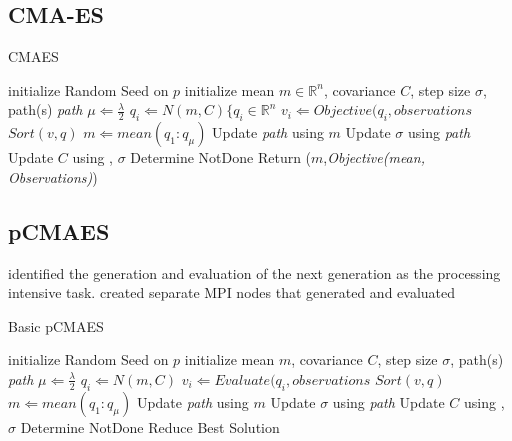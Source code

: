 \documentclass[twocolumn, balance]{article}
\begin{document}
\subsection{CMA-ES}
\begin{algorithm}[h!]
\caption{CMAES}
\label{CMAES}
\begin{algorithmic}
\STATE initialize Random Seed on $p$
\STATE initialize mean $m \in \mathbb{R}^n$, covariance $C$, step size $\sigma$, path(s) \textit{path}
\STATE $\mu \Leftarrow \frac{\lambda}{2}$
		\STATE $q_i \Leftarrow N(m,C) \{q_i \in \mathbb{R}^n$
		\STATE $v_i \Leftarrow \textit{Objective}(q_i, \textit{observations}$
	\ENDFOR
	\STATE $\textit{Sort}(v,q)$
	\STATE $m \Leftarrow \textit{mean}(q_1:q_\mu)$
	\STATE Update \textit{path} using $m$
	\STATE Update $\sigma$ using \textit{path}
	\STATE Update $C$ using , $\sigma$
	\STATE Determine NotDone
	\ENDWHILE
	\STATE Return ($m$,\textit{Objective(mean, Observations)}) 

\end{algorithmic}
\end{algorithm}

\subsection{pCMAES} 
identified the generation and evaluation of the next generation as the processing intensive task.
created separate MPI nodes that generated and evaluated 

\begin{algorithm}[h!]
\caption{Basic pCMAES}
\label{pCMAES}
\begin{algorithmic}
	\STATE initialize Random Seed on $p$
	\STATE initialize mean $m$, covariance $C$, step size $\sigma$, path(s) \textit{path}
	\STATE $\mu \Leftarrow \frac{\lambda}{2}$
			\STATE $q_i \Leftarrow N(m,C)$
			\STATE $v_i \Leftarrow \textit{Evaluate}(q_i, \textit{observations}$
		\ENDFOR
		\STATE $\textit{Sort}(v,q)$
		\STATE $m \Leftarrow \textit{mean}(q_1:q_\mu)$
		\STATE Update \textit{path} using $m$
		\STATE Update $\sigma$ using \textit{path}
		\STATE Update $C$ using , $\sigma$
		\STATE Determine NotDone
	\ENDWHILE
	\STATE Reduce Best Solution
\ENDFOR
\end{algorithmic}
\end{algorithm}
\end{document}
